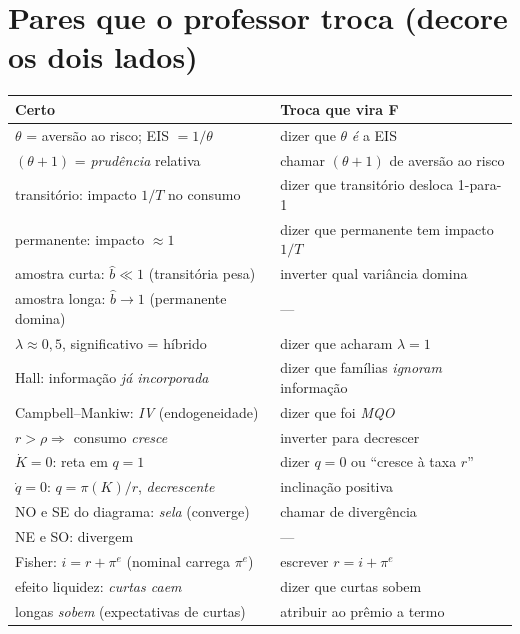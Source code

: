\documentclass[12pt, a4paper]{article}
\begin{document}
\section{Pares que o professor troca (decore os dois lados)}

\begin{resultbox}[title={Conceito certo $\times$ troca falsa}]
\renewcommand{\arraystretch}{1.25}
\begin{tabular}{p{6.6cm} p{6.9cm}}
\toprule
\textbf{Certo} & \textbf{Troca que vira F} \\
\midrule
$\theta$ = aversão ao risco; EIS $= 1/\theta$ &
dizer que $\theta$ \emph{é} a EIS \\
$(\theta + 1)$ = \emph{prudência} relativa &
chamar $(\theta+1)$ de aversão ao risco \\
transitório: impacto $1/T$ no consumo &
dizer que transitório desloca 1-para-1 \\
permanente: impacto $\approx 1$ &
dizer que permanente tem impacto $1/T$ \\
amostra curta: $\hat b \ll 1$ (transitória pesa) &
inverter qual variância domina \\
amostra longa: $\hat b \to 1$ (permanente domina) &
--- \\
$\lambda \approx 0{,}5$, significativo = híbrido &
dizer que acharam $\lambda = 1$ \\
Hall: informação \emph{já incorporada} &
dizer que famílias \emph{ignoram} informação \\
Campbell--Mankiw: \emph{IV} (endogeneidade) &
dizer que foi \emph{MQO} \\
$r > \rho \Rightarrow$ consumo \emph{cresce} &
inverter para decrescer \\
$\dot K = 0$: reta em $q = 1$ &
dizer $q = 0$ ou ``cresce à taxa $r$'' \\
$\dot q = 0$: $q = \pi(K)/r$, \emph{decrescente} &
inclinação positiva \\
NO e SE do diagrama: \emph{sela} (converge) &
chamar de divergência \\
NE e SO: divergem &
--- \\
Fisher: $i = r + \pi^e$ (nominal carrega $\pi^e$) &
escrever $r = i + \pi^e$ \\
efeito liquidez: \emph{curtas caem} &
dizer que curtas sobem \\
longas \emph{sobem} (expectativas de curtas) &
atribuir ao prêmio a termo \\

\end{tabular}
\end{resultbox}
\end{document}
